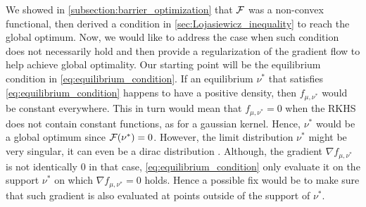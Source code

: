 We showed in \cref{subsection:barrier_optimization} that ${{\mathcal F}}$ was a non-convex functional, then derived a condition in \cref{sec:Lojasiewicz_inequality} to reach the global optimum. Now, we would like to address the case when such condition does not necessarily hold and then provide a regularization of the gradient flow to help achieve global optimality. Our starting point will be the equilibrium condition in \cref{eq:equilibrium_condition}. If an equilibrium $\nu^*$ that satisfies \cref{eq:equilibrium_condition} happens to have a positive density, then $f_{\mu,\nu^{*}}$ would be constant everywhere. This in turn would mean that $f_{\mu,\nu^{*}}=0$ when the RKHS does not contain constant functions, as for a gaussian kernel. Hence, $\nu^*$ would be a global optimum since ${{\mathcal F}}(\nu^{*})=0$. However, the limit distribution $\nu^*$  might be very singular, it can even be a dirac distribution \cite[Theorem 6]{mei2018mean}. Although, the gradient $\nabla f_{\mu,\nu^{*}}$ is not identically $0$ in that case,  \cref{eq:equilibrium_condition} only evaluate it on the support $\nu^{*}$ on which $\nabla f_{\mu,\nu^{*}}=0$ holds. Hence a possible fix would be to make sure that such gradient is also evaluated at points outside of the support of $\nu^{*}$. 
